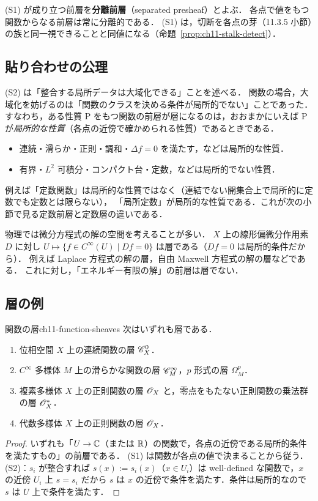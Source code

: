 (S1) が成り立つ前層を\textbf{分離前層}（separated presheaf）とよぶ．
各点で値をもつ関数からなる前層は常に分離的である．
(S1) は，切断を各点の芽（11.3.5 小節）の族と同一視できることと同値になる（命題~\ref{prop:ch11-stalk-detect}）．

\subsection{貼り合わせの公理}

(S2) は「整合する局所データは大域化できる」ことを述べる．
関数の場合，大域化を妨げるのは「関数のクラスを決める条件が局所的でない」ことであった．
すなわち，ある性質 P をもつ関数の前層が層になるのは，おおまかにいえば P が\emph{局所的な性質}（各点の近傍で確かめられる性質）であるときである．
\begin{itemize}
  \item 連続・滑らか・正則・調和・$\Delta f=0$ を満たす，などは局所的な性質．
  \item 有界・$L^2$ 可積分・コンパクト台・定数，などは局所的でない性質．
\end{itemize}
例えば「定数関数」は局所的な性質ではなく（連結でない開集合上で局所的に定数でも定数とは限らない），
「局所定数」が局所的な性質である．これが次の小節で見る定数前層と定数層の違いである．

物理では微分方程式の解の空間を考えることが多い．
$X$ 上の線形偏微分作用素 $D$ に対し $U\mapsto\{f\in C^\infty(U)\mid Df=0\}$ は層である（$Df=0$ は局所的条件だから）．
例えば Laplace 方程式の解の層，自由 Maxwell 方程式の解の層などである．
これに対し，「エネルギー有限の解」の前層は層でない．

\subsection{層の例}

\begin{myprop}{関数の層}{ch11-function-sheaves}
次はいずれも層である．
\begin{enumerate}
  \item 位相空間 $X$ 上の連続関数の層 $\mathscr{C}^0_X$．
  \item $C^\infty$ 多様体 $M$ 上の滑らかな関数の層 $\mathscr{C}^\infty_M$，$p$ 形式の層 $\Omega^p_M$．
  \item 複素多様体 $X$ 上の正則関数の層 $\mathscr{O}_X$ と，零点をもたない正則関数の乗法群の層 $\mathscr{O}_X^*$．
  \item 代数多様体 $X$ 上の正則関数の層 $\mathscr{O}_X$．
\end{enumerate}
\end{myprop}
\begin{proof}
いずれも「$U\to\mathbb{C}$（または $\mathbb{R}$）の関数で，各点の近傍である局所的条件を満たすもの」の前層である．
(S1) は関数が各点の値で決まることから従う．
(S2)：$s_i$ が整合すれば $s(x):=s_i(x)$（$x\in U_i$）は well-defined な関数で，$x$ の近傍 $U_i$ 上 $s=s_i$ だから $s$ は $x$ の近傍で条件を満たす．条件は局所的なので $s$ は $U$ 上で条件を満たす．
\end{proof}

